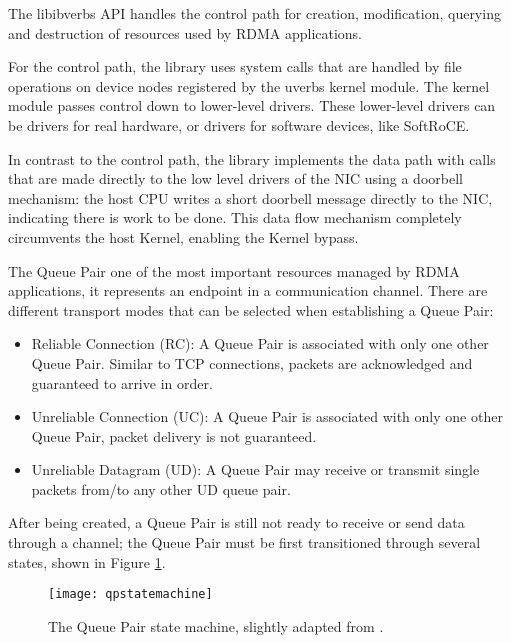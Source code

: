 The libibverbs API handles the control path for creation, modification, querying and destruction of resources used by RDMA applications.

For the control path, the library uses system calls that are handled by file operations on device nodes
registered by the uverbs kernel module. The kernel module passes control down to lower-level drivers.
These lower-level drivers can be drivers for real hardware, or drivers for software devices, like SoftRoCE.

In contrast to the control path,  the library implements the data path with calls that are made
directly to the low level drivers of the NIC using a doorbell mechanism: the host CPU %
writes a short doorbell message directly to the
NIC, indicating there is work to be done\cite{KaliaUsingRDMAEfficiently2014}. This data flow mechanism completely circumvents the
host Kernel, enabling the Kernel bypass\cite{kaliaDesignGuidelinesHigh2016}.

The Queue Pair one of the most important resources managed by RDMA applications, it represents an endpoint
in a communication channel. There are different transport modes that can be selected when establishing a Queue Pair\cite{rdmamanual}:

\begin{itemize}
  \item Reliable Connection (RC): A Queue Pair is associated with only one other Queue Pair. Similar to TCP connections, packets are acknowledged and guaranteed to arrive in order.
  \item Unreliable Connection (UC): A Queue Pair is associated with only one other Queue Pair, packet delivery is not guaranteed.
  \item Unreliable Datagram (UD): A Queue Pair may receive or transmit single packets from/to any other UD queue pair.
\end{itemize}

After being created, a Queue Pair is still not ready to receive or send data through a channel; the Queue Pair must be first
transitioned through several states, shown in Figure \ref{fig:qpstatemachine}.

\begin{figure}[h!]
  \centering
  \texttt{[image: qpstatemachine]}
  \caption[Queue Pair state machine]{The Queue Pair state machine, slightly adapted from \cite{QPStateMachine2012}.}
  \label{fig:qpstatemachine}
\end{figure}

